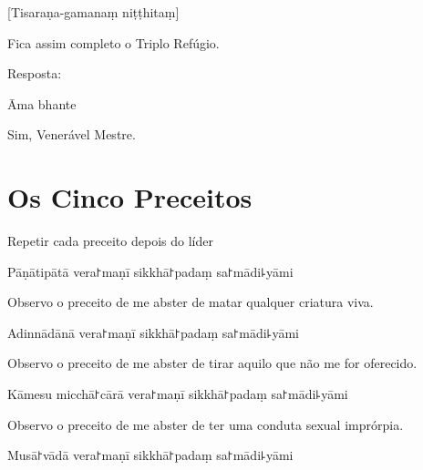 [Tisaraṇa-gamanaṃ niṭṭhitaṃ]

\begin{english}
  Fica assim completo o Triplo Refúgio.
\end{english}

\begin{instruction}
  Resposta:
\end{instruction}

Āma bhante

\begin{english}
  Sim, Venerável Mestre.
\end{english}

\chapter{Os Cinco Preceitos}

\begin{instruction}
  Repetir cada preceito depois do líder
\end{instruction}

\begin{precept}
  \setcounter{enumi}{0}
  \item Pāṇātipātā vera꜓maṇī sikkhā꜓padaṃ sa꜓mādi꜕yāmi
\end{precept}

\begin{english}
  Observo o preceito de me abster de matar qualquer criatura viva.
\end{english}

\begin{precept}
  \setcounter{enumi}{1}
  \item Adinnādānā vera꜓maṇī sikkhā꜓padaṃ sa꜓mādi꜕yāmi
\end{precept}

\begin{english}
  Observo o preceito de me abster de tirar aquilo que não me for oferecido.
\end{english}

\begin{precept}
  \setcounter{enumi}{2}
  \item Kāmesu micchā꜓cārā vera꜓maṇī sikkhā꜓padaṃ sa꜓mādi꜕yāmi
\end{precept}

\begin{english}
  Observo o preceito de me abster de ter uma conduta sexual imprórpia.
\end{english}

\begin{precept}
  \setcounter{enumi}{3}
  \item Musā꜓vādā vera꜓maṇī sikkhā꜓padaṃ sa꜓mādi꜕yāmi
\end{precept}


